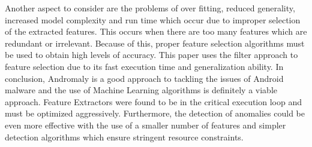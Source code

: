 \documentclass[11pt]{article}
\begin{document}
		Another aspect to consider are the problems of over fitting, reduced generality, increased model complexity and run time which occur due to improper selection of the extracted features. This occurs when there are too many features which are redundant or irrelevant. Because of this, proper feature selection algorithms must be used to obtain high levels of accuracy. This paper uses the filter approach to feature selection due to its fast execution time and generalization ability.
		In conclusion, Andromaly is a good approach to tackling the issues of Android malware and the use of Machine Learning algorithms is definitely a viable approach. Feature Extractors were found to be in the critical execution loop and must be optimized aggressively. Furthermore, the detection of anomalies could be even more effective with the use of a smaller number of features and simpler detection algorithms which ensure stringent resource constraints.
\end{document}
